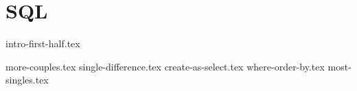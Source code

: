 \documentclass{exam}
\begin{document}
\newpage
\section{SQL}
\lstset{language=SQL}
{intro-first-half.tex}
\begin{questions}
    \setcounter{question}{4}
    {more-couples.tex}
    {single-difference.tex}
    {create-as-select.tex}
    {where-order-by.tex}
    {most-singles.tex}
\end{questions}

\newpage
\end{document}
